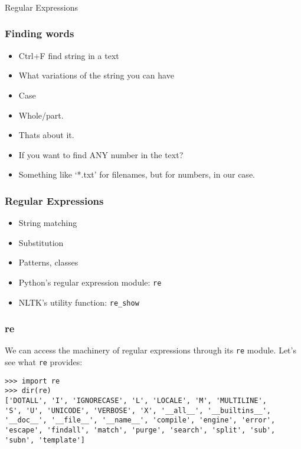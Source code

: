  \begin{frame}[fragile]\frametitle{}
\begin{center}
{\Large Regular Expressions}
\end{center}
\end{frame}


 \begin{frame}[fragile]
\frametitle{Finding words}
\begin{itemize}
\item Ctrl+F find string in a text
\item What variations of the string you can have
\item Case
\item Whole/part.
\item Thats about it.
\item If you want to find ANY number in the text?
\item Something like `*.txt' for filenames, but for numbers, in our case.
\end{itemize}
\end{frame}


 \begin{frame}[fragile]
\frametitle{Regular Expressions}
\begin{itemize}
\item String matching
\item Substitution
\item Patterns, classes
\item Python's regular expression module: \texttt{re}
\item NLTK's utility function: \texttt{re\_show}
\end{itemize}
\end{frame}

 \begin{frame}[fragile]
\frametitle{re}
We can access the machinery of regular expressions through its
\lstinline{re} module.  Let's see what \lstinline{re} provides:
\begin{lstlisting}
>>> import re
>>> dir(re)
['DOTALL', 'I', 'IGNORECASE', 'L', 'LOCALE', 'M', 'MULTILINE', 
'S', 'U', 'UNICODE', 'VERBOSE', 'X', '__all__', '__builtins__',
'__doc__', '__file__', '__name__', 'compile', 'engine', 'error',
'escape', 'findall', 'match', 'purge', 'search', 'split', 'sub',
'subn', 'template']
\end{lstlisting}
\end{frame}

